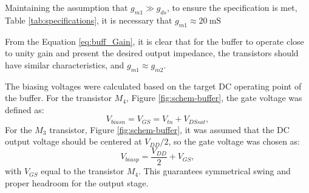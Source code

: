 Maintaining the assumption that $g_{m1} \gg g_{ds}$, to ensure the specification is met, Table \ref{tab:specifications}, it is necessary that $g_{m1} \approx \SI{20}{\milli\siemens}$

From the Equation \ref{eq:buff_Gain}, it is clear that for the buffer to operate close to unity gain and present the desired output impedance, the transistors should have similar characteristics, and $g_{m1} \approx g_{m2}$. 

The biasing voltages were calculated based on the target DC operating point of the buffer. For the transistor $M_4$, Figure \ref{fig:schem-buffer}, the gate voltage was defined as:
\[
    V_{biasn} = V_{GS} = V_{tn} + V_{DSsat},
\]
For the $M_3$ transistor, Figure \ref{fig:schem-buffer}, it was assumed that the DC output voltage should be centered at $V_{DD}/2$, so the gate voltage was chosen as:
\[
    V_{biasp} = \frac{V_{DD}}{2} + V_{GS},
\]
with $V_{GS}$ equal to the transistor $M_4$. This guarantees symmetrical swing and proper headroom for the output stage.